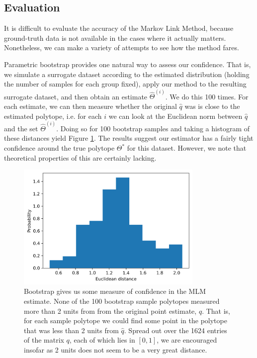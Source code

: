 \subsection{Evaluation}

It is difficult to evaluate the accuracy of the Markov Link Method, because ground-truth data is not available in the cases where it actually matters.  Nonetheless, we can make a variety of attempts to see how the method fares.

Parametric bootstrap provides one natural way to assess our confidence.  That is, we simulate a surrogate dataset according to the estimated distribution (holding the number of samples for each group fixed), apply our method to the resulting surrogate dataset, and then obtain an estimate $\hat \Theta^{(i)}$.  We do this 100 times.  For each estimate, we can then measure whether the original $\hat q$ was is close to the estimated polytope, i.e. for each $i$ we can look at the Euclidean norm between $\hat q$ and the set $\hat \Theta^{(i)}$.  Doing so for 100 bootstrap samples and taking a histogram of these distances yield Figure \ref{fig:bootstrap}.  The results suggest our estimator has a fairly tight confidence around the true polytope $\Theta^*$ for this dataset.  However, we note that theoretical properties of this are certainly lacking.

\begin{figure}
\includegraphics[width=0.8\textwidth]{pics/allenbootstrap}
\caption{Bootstrap gives us some measure of confidence in the MLM estimate.  None of the 100 bootstrap sample polytopes measured more than 2 units from from the original point estimate, $\hat q$.  That is, for each sample polytope we could find some point in the polytope that was less than 2 units from $\hat q$.  Spread out over the 1624 entries of the matrix $q$, each of which lies in $[0,1]$, we are encouraged insofar as 2 units does not seem to be a very great distance.  \label{fig:bootstrap}}
\end{figure}

